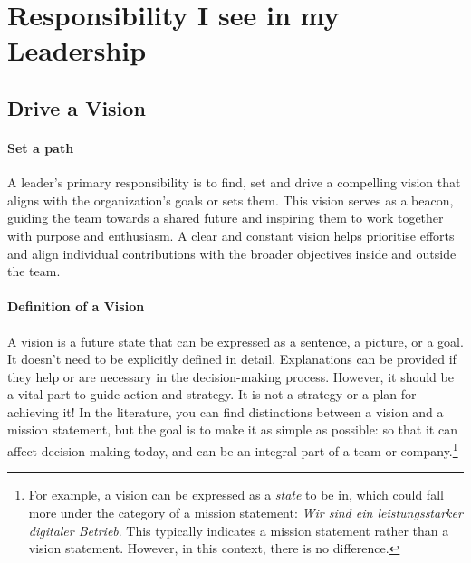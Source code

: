 \section{Responsibility I see in my Leadership}



\subsection{Drive a Vision}
\paragraph{Set a path}
A leader's primary responsibility is to find, set and drive a compelling vision that aligns with the organization's goals or sets them.
This vision serves as a beacon, guiding the team towards a shared future and inspiring them to work together with purpose and enthusiasm.
A clear and constant vision helps prioritise efforts and align individual contributions with the broader objectives inside and outside the team.

\paragraph{Definition of a Vision}
A vision is a future state that can be expressed as a sentence, a picture, or a goal.\\

It doesn't need to be explicitly defined in detail. Explanations can be provided if they help or are necessary in the decision-making process. However, it should be a vital part to guide action and strategy.
It is not a strategy or a plan for achieving it! In the literature, you can find distinctions between a vision and a mission statement, but the goal is to make it as simple as possible: so that it can affect decision-making today, and can be an integral part of a team or company.\footnote{
	For example, a vision can be expressed as a \textit{state} to be in, which could fall more under the category of a mission statement: \textit{Wir sind ein leistungsstarker digitaler Betrieb}. This typically indicates a mission statement rather than a vision statement. However, in this context, there is no difference.
}\\

